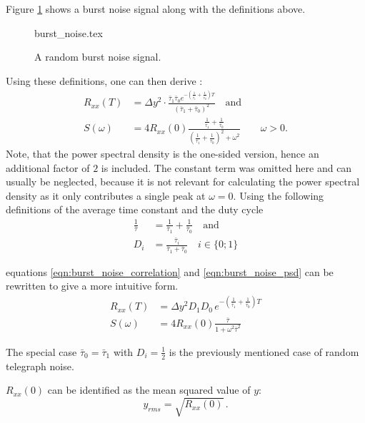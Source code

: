 Figure \ref{fig:burst_noise} shows a burst noise signal along with the definitions above.

\begin{figure}[hb]
    \centering
        {burst_noise.tex}
    \caption{A random burst noise signal.}
    \label{fig:burst_noise}
\end{figure}

Using these definitions, one can then derive \cite{burst_noise_wiener_khinchin}:
\begin{align}
    R_{xx}(T) &= \Delta y^2 \cdot \frac{\bar \tau_1 \bar \tau_0 e^{-\left(\frac{1}{\bar \tau_1}+\frac{1}{\bar \tau_0}\right)T}}{\left(\bar \tau_1 + \bar \tau_0\right)^2} \quad \text{and} \label{eqn:burst_noise_correlation}\\
    S(\omega) &= 4 R_{xx}(0) \frac{\frac{1}{\bar \tau_1} + \frac{1}{\bar \tau_0}}{\left(\frac{1}{\bar \tau_1} + \frac{1}{\bar \tau_0}\right)^2 + \omega^2} \qquad \omega > 0 . \label{eqn:burst_noise_psd}
\end{align}
Note, that the power spectral density is the one-sided version, hence an additional factor of $2$ is included. The constant term was omitted here and can usually be neglected, because it is not relevant for calculating the power spectral density as it only contributes a single peak at $\omega=0$. Using the following definitions of the average time constant and the duty cycle
\begin{align}
    \frac{1}{\bar \tau} &= \frac{1}{\bar \tau_1} + \frac{1}{\bar \tau_0} \quad \mathrm{and} \label{eqn:definition_bar_tau}\\
    D_i &= \frac{\bar \tau_i}{\bar \tau_1 + \bar \tau_0} \quad i \in \{0 ; 1\}
\end{align}

equations \ref{eqn:burst_noise_correlation} and \ref{eqn:burst_noise_psd} can be rewritten to give a more intuitive form.
\begin{align}
    R_{xx}(T) &= \Delta y^2 D_1 D_0 \, e^{-\left(\frac{1}{\bar \tau_1}+\frac{1}{\bar \tau_0}\right)T}\\
    S(\omega) &= 4 R_{xx}(0) \frac{\bar \tau}{1 + \omega^2 \bar \tau^2} \label{eqn:burst_noise_lorentzian}
\end{align}

The special case $\bar \tau_0 = \bar \tau_1$ with $D_i=\frac 1 2$ is the previously mentioned case of random telegraph noise.

$R_{xx}(0)$ can be identified as the mean squared value of $y$:
\begin{equation}
    y_{rms} = \sqrt{R_{xx}(0)} \,.
\end{equation}

